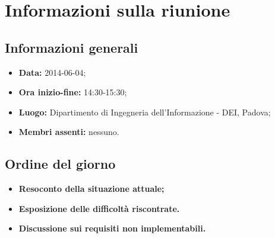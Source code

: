 \section{Informazioni sulla riunione}
\label{inforiunione}
\subsection{Informazioni generali}
\label{infogenerali}
\begin{itemize}
\item\textbf{Data:} 2014-06-04;
\item\textbf{Ora inizio-fine:} 14:30-15:30;
\item\textbf{Luogo:} Dipartimento di Ingegneria dell'Informazione - DEI, Padova;
\item\textbf{Membri assenti:} nessuno.
\end{itemize}

\subsection{Ordine del giorno}
\label{odg}
\begin{itemize}
\item\textbf{Resoconto della situazione attuale;}
\item\textbf{Esposizione delle difficoltà riscontrate.}
\item\textbf{Discussione sui requisiti non implementabili.}
\end{itemize}